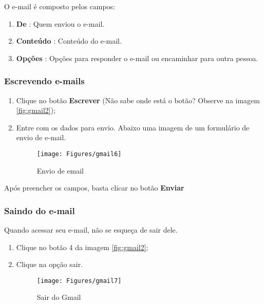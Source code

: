 \documentclass[hidelinks,12pt]{article}
\begin{document}
O e-mail é composto pelos campos:

\begin{enumerate}
	\item \textbf{De} : Quem enviou o e-mail.

	\item \textbf{Conteúdo} : Conteúdo do e-mail.

	\item \textbf{Opções} : Opções para responder o e-mail ou encaminhar para outra pessoa.
\end{enumerate}

\subsubsection{Escrevendo e-mails}

\begin{enumerate}
	\item Clique no botão \textbf{Escrever} (Não sabe onde está o botão? Observe na imagem \ref{fig:gmail2});
	\item Entre com os dados para envio. Abaixo uma imagem de um formulário de envio de e-mail.
    	\begin{figure}[!h]
    		\centering
    		\texttt{[image: Figures/gmail6]}
    		\label{fig:gmail6}
    		\caption{Envio de email}
    	\end{figure}
    
\end{enumerate}

Após preencher os campos, basta clicar no botão \textbf{Enviar}


\subsubsection{Saindo do e-mail}
Quando acessar seu e-mail, não se esqueça de sair dele.

\begin{enumerate}
	\item Clique no botão 4 da imagem \ref{fig:gmail2};

	\item Clique na opção sair.

	\begin{figure}[!h]
		\centering
		\texttt{[image: Figures/gmail7]}
		\label{fig:gmail7}
		\caption{Sair do Gmail}
	\end{figure}

\end{enumerate}
	
\end{document}
